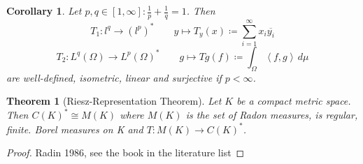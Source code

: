 \documentclass[a4paper]{article}
\newcounter{lecref}[section]
\numberwithin{lecref}{section}
\newtheorem{theorem}[lecref]{Theorem}
\newtheorem{corollary}[lecref]{Corollary}
\newcommand{\IP}[2]{\left\langle#1, #2\right\rangle}
\begin{document}
\begin{corollary}
	\label{corollary:6.8}
	Let $p, q \in [1, \infty]: \frac1p + \frac1q = 1$. Then
	\[ T_1: l^q \to (l^p)^* \qquad y \mapsto T_y(x) \coloneqq \sum_{i=1}^\infty x_i \overline{y_i} \]
	\[ T_2: L^q(\Omega) \to L^p(\Omega)^* \qquad g \mapsto Tg(f) \coloneqq \int_{\Omega} \IP fg \, d\mu \]
	are well-defined, isometric, linear and surjective if $p < \infty$.
\end{corollary}


\begin{theorem}[Riesz-Representation Theorem]
	\label{theorem:6.9}
	Let $K$ be a compact metric space. Then
	$C(K)^* \cong M(K)$ where $M(K)$ is the set of Radon measures, is regular, finite. Borel measures on K and $T: M(K) \to C(K)^*$.
\end{theorem}

\begin{proof}
	Radin 1986, see the book in the literature list
\end{proof}

\printindex
\end{document}
